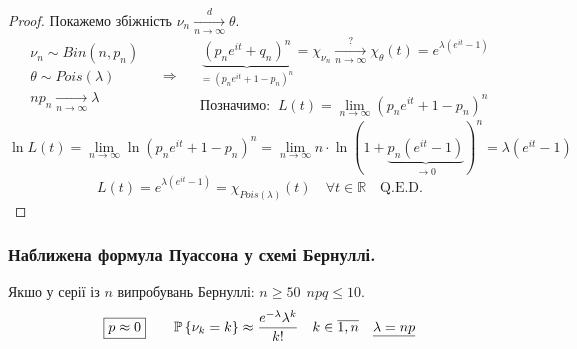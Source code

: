 \begin{proof} Покажемо збіжність $\nu_n \xrightarrow[n\to\infty]{d} \theta$.
 $$
 \begin{gathered}
    \nu_n \sim Bin(n,p_n) \\ \theta \sim Pois(\lambda) \\ np_n \xrightarrow[n\to\infty]{} \lambda
 \end{gathered} \quad \Rightarrow \quad \begin{gathered}
    \underbrace{\left( p_n e^{it} + q_n \right)^n}_{= \left( p_n e^{it} + 1-p_n \right)^n} = \chi_{\nu_n} \xrightarrow[n\to\infty]{?}\chi_{\theta}(t) = e^{\lambda \left( e^{it} -1 \right)}\\
    \text{Позначимо: } \  L(t) =  \lim\limits_{n\to  \infty}{\left( p_n e^{it} + 1-p_n \right)^n}
 \end{gathered}
 $$
 $$
 \ln L(t) =  \lim\limits_{n\to  \infty}{\ln \left( p_n e^{it} + 1-p_n \right)^n} =  \lim\limits_{n\to  \infty}{ n \cdot \ln \left(1 + \underbrace{p_n (e^{it}-1) }_{\to 0} \right)^n} =  \lambda (e^{it} - 1)
 $$
 $$
 L(t) = e^{\lambda(e^{it} -1 )} = \chi_{Pois(\lambda)}(t) \quad \forall t \in \mathbb{R} \quad \text{Q.E.D.}
 $$
\end{proof}
\subsubsection{Наближена формула Пуассона у схемі Бернуллі.}
Якшо у серії із $n$ випробувань Бернуллі: $n\geq 50 \ \  npq \leq 10$.
$$
\fbox{$p \approx 0$} \qquad \mathbb{P} \left\lbrace \nu_k = k \right\rbrace \approx \frac{e^{-\lambda}\lambda^k}{k!} \quad k \in \overline{1,n} \quad \underline{\lambda =  np}
$$
